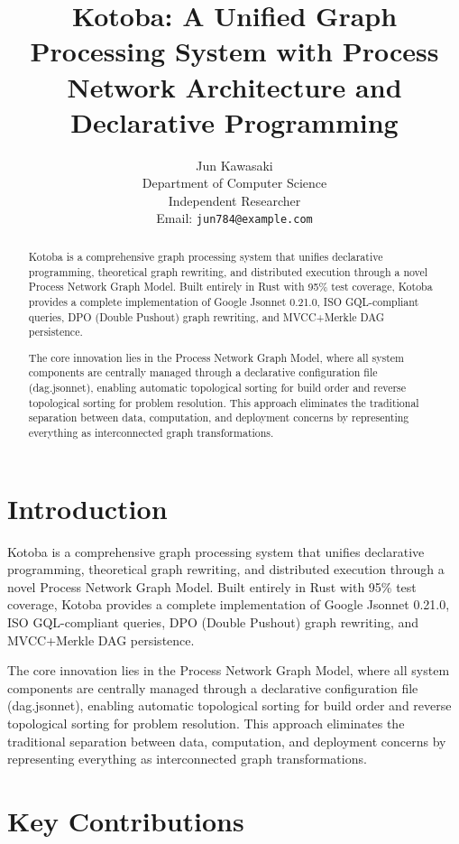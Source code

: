 \documentclass[11pt,a4paper]{article}
\title{Kotoba: A Unified Graph Processing System with Process Network Architecture and Declarative Programming}
\author{
Jun Kawasaki \\
Department of Computer Science \\
Independent Researcher \\
Email: \texttt{jun784@example.com}
}
\begin{document}
\maketitle

\begin{abstract}
Kotoba is a comprehensive graph processing system that unifies declarative programming, theoretical graph rewriting, and distributed execution through a novel Process Network Graph Model. Built entirely in Rust with 95\% test coverage, Kotoba provides a complete implementation of Google Jsonnet 0.21.0, ISO GQL-compliant queries, DPO (Double Pushout) graph rewriting, and MVCC+Merkle DAG persistence.

The core innovation lies in the Process Network Graph Model, where all system components are centrally managed through a declarative configuration file (dag.jsonnet), enabling automatic topological sorting for build order and reverse topological sorting for problem resolution. This approach eliminates the traditional separation between data, computation, and deployment concerns by representing everything as interconnected graph transformations.
\end{abstract}

\section{Introduction}
\label{sec:introduction}

Kotoba is a comprehensive graph processing system that unifies declarative programming, theoretical graph rewriting, and distributed execution through a novel Process Network Graph Model. Built entirely in Rust with 95\% test coverage, Kotoba provides a complete implementation of Google Jsonnet 0.21.0, ISO GQL-compliant queries, DPO (Double Pushout) graph rewriting, and MVCC+Merkle DAG persistence.

The core innovation lies in the Process Network Graph Model, where all system components are centrally managed through a declarative configuration file (dag.jsonnet), enabling automatic topological sorting for build order and reverse topological sorting for problem resolution. This approach eliminates the traditional separation between data, computation, and deployment concerns by representing everything as interconnected graph transformations.

\section{Key Contributions}
\label{sec:contributions}
\end{document}
